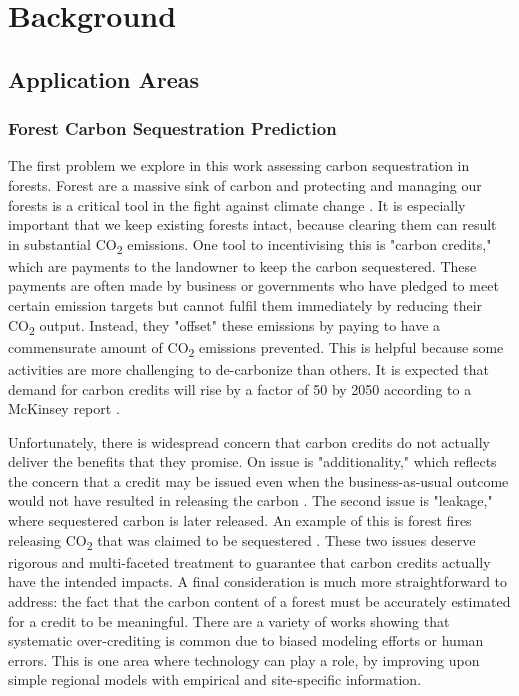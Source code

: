 \chapter{Background} \label{chapBackground}
\section{Application Areas}
\subsection{Forest Carbon Sequestration Prediction}
The first problem we explore in this work assessing carbon sequestration in forests. Forest are a massive sink of carbon and protecting and managing our forests is a critical tool in the fight against climate change \cite{Griscom2017NaturalSolutions}. 
It is especially important that we keep existing forests intact, because clearing them can result in substantial CO\textsubscript{2} emissions. 
One tool to incentivising this is "carbon credits," which are payments to the landowner to keep the carbon sequestered. These payments are often made by business or governments who have pledged to meet certain emission targets but cannot fulfil them immediately by reducing their CO\textsubscript{2} output. Instead, they "offset" these emissions by paying to have a commensurate amount of CO\textsubscript{2} emissions prevented. This is helpful because some activities are more challenging to de-carbonize than others. 
It is expected that demand for carbon credits will rise by a factor of 50 by 2050 according to a McKinsey report \cite{Blaufelder2021AChallenge}. 

Unfortunately, there is widespread concern that carbon credits do not actually deliver the benefits that they promise. On issue is "additionality," which reflects the concern that a credit may be issued even when the business-as-usual outcome would not have resulted in releasing the carbon \cite{Gillenwater2011TheProgramme}.
The second issue is "leakage," where sequestered carbon is later released. An example of this is forest fires releasing CO\textsubscript{2} that was claimed to be sequestered \cite{NYTimes}. These two issues deserve rigorous and multi-faceted treatment to guarantee that carbon credits actually have the intended impacts. A final consideration is much more straightforward to address: the fact that the carbon content of a forest must be accurately estimated for a credit to be meaningful. There are a variety of works showing that systematic over-crediting is common \cite{Badgley2022SystematicProgram,West2020OverstatedAmazon} due to biased modeling efforts or human errors. This is one area where technology can play a role, by improving upon simple regional models with empirical and site-specific information. 

